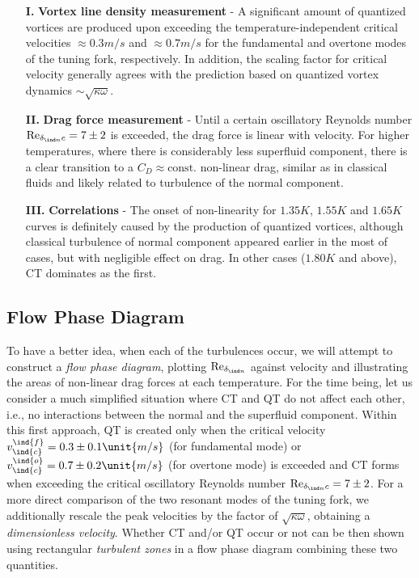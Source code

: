 \begin{itemize}
	\item[\textbf{I.}] \textbf{Vortex line density measurement} - A significant amount of quantized vortices are produced upon exceeding the temperature-independent critical velocities $ \approx 0.3 \unit{m/s} $ and $ \approx 0.7 \unit{m/s} $ for the fundamental and overtone modes of the tuning fork, respectively. In addition, the scaling factor for critical velocity generally agrees with the prediction based on quantized vortex dynamics $ \sim \sqrt{\kappa \omega} $.
	
	\item[\textbf{II.}] \textbf{Drag force measurement} - Until a certain oscillatory Reynolds number $ \text{Re}_{\delta_{\ind n}c}=7\pm 2 $ is exceeded, the drag force is linear with velocity. For higher temperatures, where there is considerably less superfluid component, there is a clear transition to a $ C_D \approx \text{const.} $ non-linear drag, similar as in classical fluids and likely related to turbulence of the normal component. 
	
	\item[\textbf{III.}] \textbf{Correlations} - The onset of non-linearity for $ 1.35\unit{K} $, $ 1.55\unit{K} $ and $ 1.65\unit{K} $ curves is definitely caused by the production of quantized vortices, although classical turbulence of normal component appeared earlier in the most of cases, but with negligible effect on drag. In other cases ($ 1.80 \unit{K}$ and above), CT dominates as the first.
\end{itemize}


\subsection*{Flow Phase Diagram}

To have a better idea, when each of the turbulences occur, we will attempt to construct a \textit{flow phase diagram}, plotting $ \text{Re}_{\delta_{\ind n}} $ against velocity and illustrating the areas of non-linear drag forces at each temperature. For the time being, let us consider a much simplified situation where CT and QT do not affect each other, i.e., no interactions between the normal and the superfluid component. Within this first approach, QT is created only  when the critical velocity $ v_{\ind{c}}^{\ind{{f}}} = 0.3 \pm 0.1 \unit{m/s}$ (for fundamental mode) or $ v_{\ind{c}}^{\ind{{o}}} = 0.7 \pm 0.2 \unit{m/s}$ (for overtone mode) is exceeded and CT forms when exceeding the critical oscillatory Reynolds number $ \text{Re}_{\delta_{\ind n}c}=7\pm 2 $. For a more direct comparison of the two resonant modes of the tuning fork, we additionally rescale the peak velocities by the factor of $\sqrt{\kappa \omega}$, obtaining a \textit{dimensionless velocity}. Whether CT and/or QT occur or not can be then shown using rectangular \textit{turbulent zones} in a flow phase diagram combining these two quantities.

